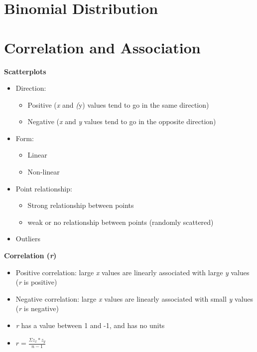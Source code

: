 \documentclass{article}
\begin{document}
\section{Binomial Distribution}

\section{Correlation and Association}

\textbf{Scatterplots}
\begin{itemize}
    \item Direction:
    \begin{itemize}
        \item Positive (\emph{x} and \emph(y) values tend to go in the same direction)
        \item Negative (\emph{x} and \emph{y} values tend to go in the opposite direction)
    \end{itemize}
    \item Form:
    \begin{itemize}
        \item Linear
        \item Non-linear
    \end{itemize}
    \item Point relationship:
    \begin{itemize}
        \item Strong relationship between points
        \item weak or no relationship between points (randomly scattered)
    \end{itemize}
    \item Outliers
\end{itemize}

\noindent
\textbf{Correlation (\emph{r})}
\begin{itemize}
    \item Positive correlation: large \emph{x} values are linearly associated with large \emph{y} values (\emph{r} is positive)
    \item Negative correlation: large \emph{x} values are linearly associated with small \emph{y} values (\emph{r} is negative)
    \item \emph{r} has a value between 1 and -1, and has no units
    \item \begin{math}
    r = \frac{\Sigma z_x * z_y}{n - 1}
    \end{math}
\end{itemize}
\end{document}
